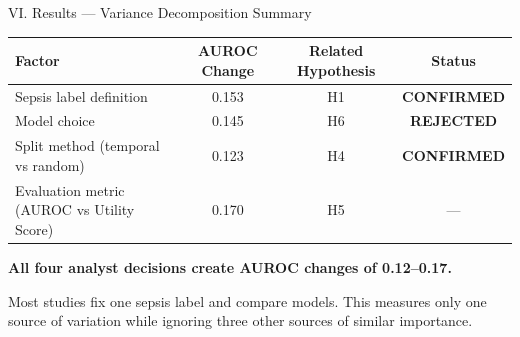 \begin{frame}{VI. Results --- Variance Decomposition Summary}
\begin{center}\tablestyle
\begin{tabular}{lccc}
\toprule
\textbf{Factor} & \textbf{AUROC Change}
  & \textbf{Related Hypothesis} & \textbf{Status} \\
\midrule
Sepsis label definition
  & 0.153 & H1 & \textcolor{BabyMint!60!green}{\textbf{CONFIRMED}} \\
Model choice
  & 0.145 & H6 & \textcolor{BabyPink!70!red}{\textbf{REJECTED}} \\
Split method (temporal vs random)
  & 0.123 & H4 & \textcolor{BabyMint!60!green}{\textbf{CONFIRMED}} \\
Evaluation metric (AUROC vs Utility Score)
  & 0.170 & H5 & --- \\
\bottomrule
\end{tabular}
\end{center}

\vspace{8pt}
\textbf{All four analyst decisions create AUROC changes of 0.12--0.17.}

\vspace{4pt}
Most studies fix one sepsis label and compare models. This measures only one
source of variation while ignoring three other sources of similar importance.
\end{frame}
